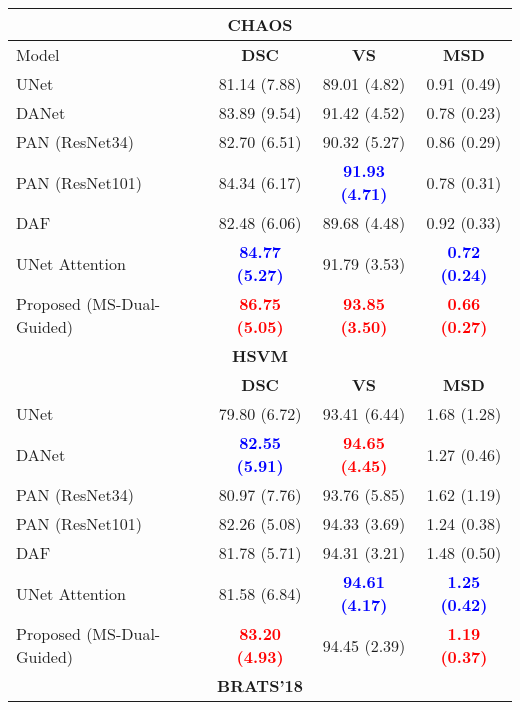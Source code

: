 \documentclass[journal]{IEEEtran}
\begin{document}
\begin{table}[t!]
\centering
\scriptsize
\begin{tabular}{lccc}\\
\toprule
\multicolumn{4}{c}{\textbf{CHAOS}}\\
\midrule
Model & \textbf{DSC} & \textbf{VS} & \textbf{MSD} \\
 \midrule
UNet \cite{ronneberger2015u}  &  81.14 (7.88) & 89.01 (4.82) & 0.91 (0.49)  \\
DANet \cite{fu2018dual}  &   83.89 (9.54) & 91.42  (4.52) &  0.78  (0.23) \\
PAN (ResNet34) \cite{li2018pyramid}    & 82.70 (6.51) & 90.32 (5.27) & 0.86 (0.29) \\
PAN (ResNet101)\cite{li2018pyramid}   & 84.34 (6.17) & \textcolor{blue}{\textbf{91.93 (4.71)}} & 0.78 (0.31)  \\
DAF \cite{wang18d}  &   82.48 (6.06)  & 89.68 (4.48) &  0.92 (0.33) \\
UNet Attention \cite{schlemper2019attention}  &  \textcolor{blue}{\textbf{84.77 (5.27)}} & 91.79 (3.53) & \textcolor{blue}{\textbf{0.72 (0.24)}} \\
Proposed (MS-Dual-Guided)  &  \textcolor{red}{\textbf{86.75 (5.05)}} & \textcolor{red}{\textbf{93.85 (3.50)}} & \textcolor{red}{\textbf{0.66 (0.27)}}  \\
\midrule
\multicolumn{4}{c}{\textbf{HSVM}}\\
\midrule
& \textbf{DSC} & \textbf{VS} & \textbf{MSD}\\
 \midrule
UNet \cite{ronneberger2015u}  &  79.80 (6.72) & 93.41 (6.44) & 1.68 (1.28)\\
DANet \cite{fu2018dual}  &   \textcolor{blue}{\textbf{82.55 (5.91)}} & \textcolor{red}{\textbf{94.65 (4.45)}} & 1.27 (0.46) \\
PAN (ResNet34) \cite{li2018pyramid}    &  80.97 (7.76) & 93.76 (5.85) & 1.62 (1.19) \\
PAN (ResNet101)\cite{li2018pyramid}   &  82.26 (5.08) & 94.33 (3.69) & 1.24 (0.38) \\
DAF \cite{wang18d}  &    81.78 (5.71)& 94.31 (3.21) & 1.48 (0.50) \\
UNet Attention \cite{schlemper2019attention}  & 81.58 (6.84) & \textcolor{blue}{\textbf{94.61 (4.17)}} & \textcolor{blue}{\textbf{1.25 (0.42)}} \\
Proposed (MS-Dual-Guided)  &  \textcolor{red}{\textbf{83.20 (4.93)}} & 94.45 (2.39) & \textcolor{red}{\textbf{1.19 (0.37)}} \\
\midrule
\multicolumn{4}{c}{\textbf{BRATS'18}}\\

\end{tabular}
\end{table}
\end{document}
